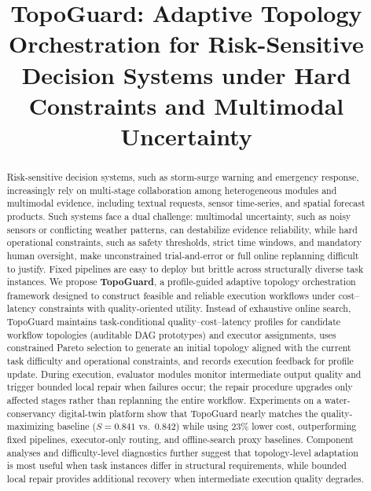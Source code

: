 \documentclass[manuscript,review,anonymous]{acmart}
\begin{document}
\title{TopoGuard: Adaptive Topology Orchestration for Risk-Sensitive Decision Systems under Hard Constraints and Multimodal Uncertainty}



\begin{abstract}
Risk-sensitive decision systems, such as storm-surge warning and emergency response, increasingly rely on multi-stage collaboration among heterogeneous modules and multimodal evidence, including textual requests, sensor time-series, and spatial forecast products. Such systems face a dual challenge: multimodal uncertainty, such as noisy sensors or conflicting weather patterns, can destabilize evidence reliability, while hard operational constraints, such as safety thresholds, strict time windows, and mandatory human oversight, make unconstrained trial-and-error or full online replanning difficult to justify. Fixed pipelines are easy to deploy but brittle across structurally diverse task instances. We propose \textbf{TopoGuard}, a profile-guided adaptive topology orchestration framework designed to construct feasible and reliable execution workflows under cost--latency constraints with quality-oriented utility. Instead of exhaustive online search, TopoGuard maintains task-conditional quality--cost--latency profiles for candidate workflow topologies (auditable DAG prototypes) and executor assignments, uses constrained Pareto selection to generate an initial topology aligned with the current task difficulty and operational constraints, and records execution feedback for profile update. During execution, evaluator modules monitor intermediate output quality and trigger bounded local repair when failures occur; the repair procedure upgrades only affected stages rather than replanning the entire workflow. Experiments on a water-conservancy digital-twin platform show that TopoGuard nearly matches the quality-maximizing baseline ($S=0.841$ vs.\ $0.842$) while using 23\% lower cost, outperforming fixed pipelines, executor-only routing, and offline-search proxy baselines. Component analyses and difficulty-level diagnostics further suggest that topology-level adaptation is most useful when task instances differ in structural requirements, while bounded local repair provides additional recovery when intermediate execution quality degrades.
\end{abstract}
\end{document}
